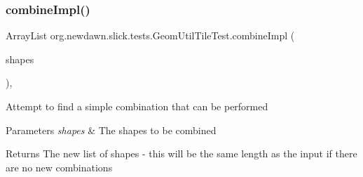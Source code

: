 \subsubsection{\texorpdfstring{combine\+Impl()}{combineImpl()}}
{\footnotesize\ttfamily Array\+List org.\+newdawn.\+slick.\+tests.\+Geom\+Util\+Tile\+Test.\+combine\+Impl (\begin{DoxyParamCaption}\item[{Array\+List}]{shapes }\end{DoxyParamCaption})\hspace{0.3cm}{\ttfamily [inline]}, {\ttfamily [private]}}

Attempt to find a simple combination that can be performed


\begin{DoxyParams}{Parameters}
{\em shapes} & The shapes to be combined \\
\hline
\end{DoxyParams}
\begin{DoxyReturn}{Returns}
The new list of shapes -\/ this will be the same length as the input if there are no new combinations 
\end{DoxyReturn}

